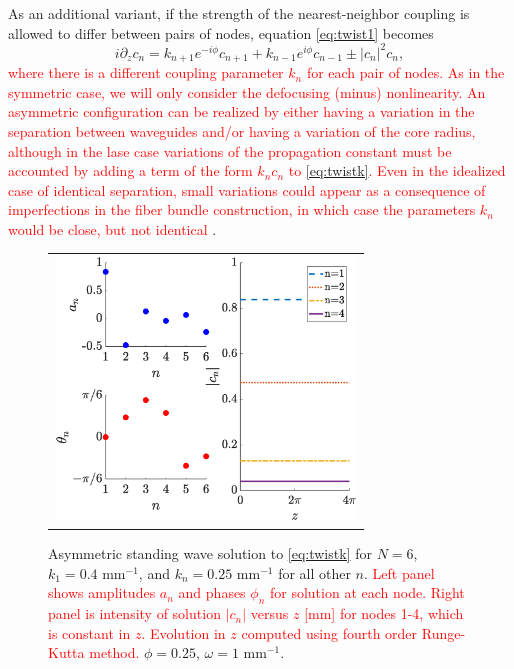 \documentclass[reprint, amsmath,amssymb,aps,pra]{revtex4-2}
\renewcommand{\revised}[1]{ \textcolor{red}{#1} }
\begin{document}
As an additional variant, if the strength of the nearest-neighbor coupling is allowed to differ between pairs of nodes, equation \cref{eq:twist1} becomes
\begin{equation}\label{eq:twistk}
i \partial_z c_n = k_{n+1} e^{-i\phi}c_{n+1} + k_{n-1} e^{i\phi}c_{n-1} \pm |c_n|^2 c_n,
\end{equation}
\revised{where there is a different coupling parameter $k_n$ for each pair of nodes. As in the symmetric case, we will  only consider the defocusing (minus) nonlinearity.} \revised{An asymmetric configuration can be realized by either having a variation in the separation between waveguides and/or having a variation of the core radius, although in the lase case variations of the propagation constant must be accounted by adding a term of the form $k_nc_n$ to \cref{eq:twistk}. Even in the idealized case of identical separation, small variations could appear as a consequence of imperfections in the fiber bundle construction, in which case the parameters $k_n$ would be close, but not identical}. 
\begin{figure}
\begin{center}
\begin{tabular}{c}
\includegraphics[width=8cm]{even6assym.eps}
\end{tabular}
\end{center}
\caption{Asymmetric standing wave solution to \cref{eq:twistk} for $N = 6$, $k_1 = 0.4\text{ mm}^{-1}$, and $k_n = 0.25\text{ mm}^{-1}$ for all other $n$. \revised{Left panel shows amplitudes $a_n$ and phases $\phi_n$ for solution at each node. Right panel is intensity of solution $|c_n|$ versus $z$ [mm] for nodes 1-4, which is constant in $z$. Evolution in $z$ computed using fourth order Runge-Kutta method.} $\phi = 0.25$, $\omega = 1\text{ mm}^{-1}$.}
\label{fig:even6assym}
\end{figure}
\end{document}
